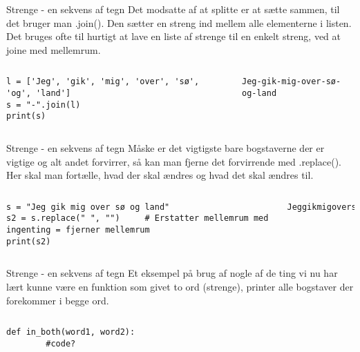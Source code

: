 \documentclass[main.tex]{subfiles}
\begin{document}
\begin{frame}[fragile]{Strenge - en sekvens af tegn}
	Det modsatte af at splitte er at sætte sammen, til det bruger man .join(). Den sætter en streng ind mellem alle elementerne i listen. Det bruges ofte til hurtigt at lave en liste af strenge til en enkelt streng, ved at joine med mellemrum.
	\begin{columns}
		\begin{lstlisting}[style=python]
l = ['Jeg', 'gik', 'mig', 'over', 'sø', 'og', 'land']
s = "-".join(l)
print(s)
		\end{lstlisting}
		
		\pause
		\begin{lstlisting}[style=python]
Jeg-gik-mig-over-sø-og-land
		\end{lstlisting}
	\end{columns}
\end{frame}

\begin{frame}[fragile]{Strenge - en sekvens af tegn}
	Måske er det vigtigste bare bogstaverne der er vigtige og alt andet forvirrer, så kan man fjerne det forvirrende med .replace(). Her skal man fortælle, hvad der skal ændres og hvad det skal ændres til.
	\begin{columns}
		\column{0.4\textwidth}
		\begin{lstlisting}[style=python]
s = "Jeg gik mig over sø og land"
s2 = s.replace(" ", "")		# Erstatter mellemrum med ingenting = fjerner mellemrum
print(s2)
		\end{lstlisting}
		
		\pause
		\column{0.4\textwidth}
		\begin{lstlisting}[style=python]
Jeggikmigoversøogland
		\end{lstlisting}
	\end{columns}
\end{frame}

\begin{frame}[fragile]{Strenge - en sekvens af tegn}
	Et eksempel på brug af nogle af de ting vi nu har lært kunne være en funktion som givet to ord (strenge), printer alle bogstaver der forekommer i begge ord.
	\begin{columns}
		\begin{lstlisting}[style=python]
		def in_both(word1, word2):
		#code?
		\end{lstlisting}
		
		\pause
		
	\end{columns}
\end{frame}
\end{document}
